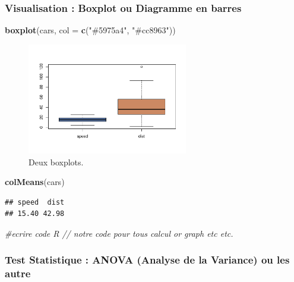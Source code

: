 \documentclass[mstat,12pt]{unswthesis}
\newenvironment{Shaded}{\begin{snugshade}}{\end{snugshade}}
\newcommand{\AttributeTok}[1]{\textcolor[rgb]{0.13,0.29,0.53}{#1}}
\newcommand{\CommentTok}[1]{\textcolor[rgb]{0.56,0.35,0.01}{\textit{#1}}}
\newcommand{\FunctionTok}[1]{\textcolor[rgb]{0.13,0.29,0.53}{\textbf{#1}}}
\newcommand{\NormalTok}[1]{#1}
\newcommand{\StringTok}[1]{\textcolor[rgb]{0.31,0.60,0.02}{#1}}
\begin{document}
\subsubsection{Visualisation : Boxplot ou Diagramme en
barres}\label{visualisation-boxplot-ou-diagramme-en-barres}

\begin{Shaded}
\begin{Highlighting}[]
\FunctionTok{boxplot}\NormalTok{(cars, }\AttributeTok{col =} \FunctionTok{c}\NormalTok{(}\StringTok{"\#5975a4"}\NormalTok{, }\StringTok{"\#cc8963"}\NormalTok{))}
\end{Highlighting}
\end{Shaded}

\begin{figure}

{\centering \includegraphics[width=7cm]{scdon2-UPV-report-template_sansPython_files/figure-latex/unnamed-chunk-3-1} 

}

\caption{\label{fig:boxplots}Deux boxplots.}\label{fig:unnamed-chunk-3}
\end{figure}

\begin{Shaded}
\begin{Highlighting}[]
\FunctionTok{colMeans}\NormalTok{(cars)}
\end{Highlighting}
\end{Shaded}

\begin{verbatim}
## speed  dist 
## 15.40 42.98
\end{verbatim}

\begin{Shaded}
\begin{Highlighting}[]
 \CommentTok{\#ecrire code R // notre code pour tous calcul or graph etc etc. }
\end{Highlighting}
\end{Shaded}

\subsubsection{Test Statistique : ANOVA (Analyse de la Variance) ou les
autre}\label{test-statistique-anova-analyse-de-la-variance-ou-les-autre}
\end{document}
